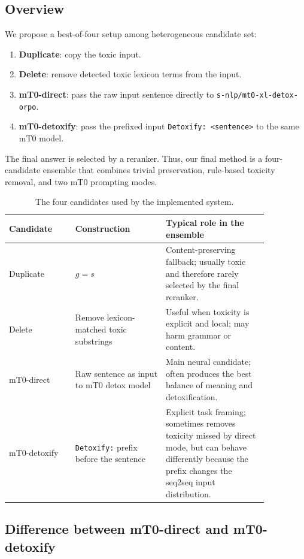 \documentclass{article}
\begin{document}
\subsection{Overview}

We propose a best-of-four setup among heterogeneous candidate set:
\begin{enumerate}[noitemsep]
    \item \textbf{Duplicate}: copy the toxic input.
    \item \textbf{Delete}: remove detected toxic lexicon terms from the input.
    \item \textbf{mT0-direct}: pass the raw input sentence directly to \texttt{s-nlp/mt0-xl-detox-orpo}.
    \item \textbf{mT0-detoxify}: pass the prefixed input \texttt{Detoxify: <sentence>} to the same mT0 model.
\end{enumerate}

The final answer is selected by a reranker. Thus, our final method is a four-candidate ensemble that combines trivial preservation, rule-based toxicity removal, and two mT0 prompting modes.

\begin{table}[tbh!]
\centering
\begin{tabular}{p{0.22\linewidth}p{0.30\linewidth}p{0.34\linewidth}}
\toprule
Candidate & Construction & Typical role in the ensemble \\
\midrule
Duplicate & $g=s$ & Content-preserving fallback; usually toxic and therefore rarely selected by the final reranker. \\
Delete & Remove lexicon-matched toxic substrings & Useful when toxicity is explicit and local; may harm grammar or content. \\
mT0-direct & Raw sentence as input to mT0 detox model & Main neural candidate; often produces the best balance of meaning and detoxification. \\
mT0-detoxify & \texttt{Detoxify:} prefix before the sentence & Explicit task framing; sometimes removes toxicity missed by direct mode, but can behave differently because the prefix changes the seq2seq input distribution. \\
\bottomrule
\end{tabular}
\caption{The four candidates used by the implemented system.}
\label{tab:candidates}
\end{table}

\subsection{Difference between mT0-direct and mT0-detoxify}
\end{document}
